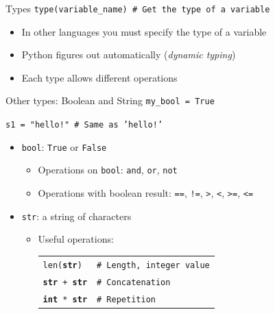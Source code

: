\documentclass[11pt]{beamer}
\begin{document}
\begin{frame}{Types}
  \texttt{type(variable\_name) \qquad \# Get the type of a variable}

  \vspace{0.3cm}
  \begin{itemize}
    \item In other languages you must specify the type of a variable
    \item Python figures out automatically (\emph{dynamic typing})
    \item Each type allows different operations
  \end{itemize}
\end{frame}


\begin{frame}{Other types: Boolean and String}
  \texttt{my\_bool = True}

  \texttt{s1 = "hello!" \qquad \# Same as 'hello!'}

  \vspace{0.3cm}
  \begin{itemize}
    \item \texttt{bool}: \texttt{True} or \texttt{False}
      \begin{itemize}
        \item Operations on \texttt{bool}:
              \texttt{and}, \texttt{or}, \texttt{not}
        \item Operations with boolean result: \texttt{==}, \texttt{!=},
              \texttt{>}, \texttt{<}, \texttt{>=}, \texttt{<=}
      \end{itemize}
    \item \texttt{str}: a string of characters
      \begin{itemize}
        \item Useful operations:

          \begin{tabular}{ll}
            \texttt{len({\bf str})} & \texttt{\# Length, integer value}   \\
            \texttt{{\bf str} + {\bf str}} & \texttt{\# Concatenation} \\
            \texttt{{\bf int} * {\bf str}} & \texttt{\# Repetition}
          \end{tabular}
      \end{itemize}
  \end{itemize}
\end{frame}
\end{document}
